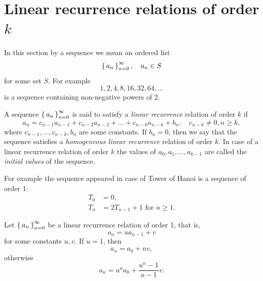 \section{Linear recurrence relations of order $k$}
In this section by a sequence we mean an ordered list
$$
\left\{\,a_n\,\right\}_{n=0}^{\infty},\quad a_n\in S
$$
for some set $S$.
For example 
$$
1,2,4,8,16,32,64,\ldots
$$
is a sequence containing non-negative powers of 2.
\begin{definition}
A sequence $\left\{\,a_n\,\right\}_{n=0}^{\infty}$  is said to satisfy a \emph{linear recurrence} relation of order $k$ if
$$
a_n=c_{n-1}a_{n-1}+c_{n-2}a_{n-2}+\ldots+c_{n-k}a_{n-k}+b_n,\quad c_{n-k}\neq 0, n\geq k,
$$
where $c_{n-1},\ldots,c_{n-k},b_n$ are some constants. If $b_n=0$, then we say that the sequence
satisfies a \emph{homogeneous linear recurrence} relation of order $k$.
In case of a linear recurrence relation of order $k$ the values of $a_0,a_1,\ldots,a_{k-1}$
are called the \emph{initial values} of the sequence.
\end{definition}
For example the sequence appeared in case of Tower of Hanoi is a sequence of order 1:
\begin{align*}
T_0&=0,\\
T_n&=2T_{n-1}+1 \mbox{ for }n\geq 1.
\end{align*}
\begin{theorem}
Let $\left\{\,a_n\,\right\}_{n=0}^{\infty}$ be a linear recurrence relation of order 1, that is, 
$$
a_n=ua_{n-1}+v
$$
for some constants $u,v$. If $u=1$, then 
$$
a_n=a_0+nv,
$$
otherwise
$$
a_n=u^na_0+\frac{u^n-1}{u-1}v.
$$
\end{theorem}

